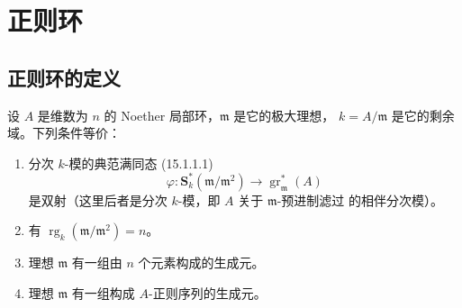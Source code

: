 \section{正则环}
\label{section:0.17-fr}

\subsection{正则环的定义}
\label{subsection:0.17.1-fr}

\begin{proposition}[17.1.1]
\label{0.17.1.1-fr}
设 $A$ 是维数为 $n$ 的 Noether 局部环，$\mathfrak{m}$ 是它的极大理想，
$k=A/\mathfrak{m}$ 是它的剩余域。下列条件等价：
\begin{enumerate}
  \item[\rm a)] 分次 $k$-模的典范满同态 (15.1.1.1)
  \[
    \varphi:\mathbf{S}^*_k(\mathfrak{m}/\mathfrak{m}^2)
    \longrightarrow\operatorname{gr}^*_{\mathfrak{m}}(A)
  \]
  是双射（这里后者是分次 $k$-模，即 $A$ 关于 $\mathfrak{m}$-预进制滤过
  的相伴分次模）。
  \item[\rm b)] 有
  $\operatorname{rg}_k(\mathfrak{m}/\mathfrak{m}^2)=n$。
  \item[\rm c)] 理想 $\mathfrak{m}$ 有一组由 $n$ 个元素构成的生成元。
  \item[\rm d)] 理想 $\mathfrak{m}$ 有一组构成 $A$-正则序列的生成元。
\end{enumerate}
\end{proposition}


